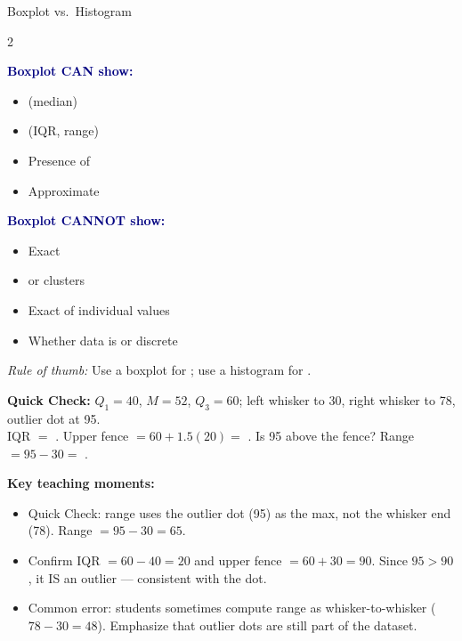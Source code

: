 \documentclass[10pt]{article}
\begin{document}
\vspace{0.08in}

\begin{notesbox}{Boxplot vs.\ Histogram}
\small
\begin{multicols}{2}

\textbf{\textcolor{navy}{Boxplot CAN show:}}
\begin{itemize}[itemsep=3pt]
  \item {} (median)
  \item {} (IQR, range)
  \item Presence of 
  \item Approximate 
\end{itemize}

\columnbreak

\textbf{\textcolor{navy}{Boxplot CANNOT show:}}
\begin{itemize}[itemsep=3pt]
  \item Exact 
  \item {} or clusters
  \item Exact  of individual values
  \item Whether data is  or discrete
\end{itemize}

\end{multicols}

\vspace{4pt}
\textit{Rule of thumb:} Use a boxplot for ;
use a histogram for .
\end{notesbox}

\vspace{0.08in}

\begin{tcolorbox}[colback=goldbg, colframe=goldacc, boxrule=0.8pt, arc=2mm,
    left=4mm, right=4mm, top=2mm, bottom=2mm]
\small\textbf{Quick Check:} $Q_1 = 40$, $M = 52$, $Q_3 = 60$; left whisker to 30,
right whisker to 78, outlier dot at 95.\\[4pt]
IQR $= $ . \quad
Upper fence $= 60 + 1.5(20) = $ . \quad
Is 95 above the fence?  \quad
Range $= 95 - 30 = $ .
\end{tcolorbox}

\begin{teachernote}
\textbf{Key teaching moments:}
\begin{itemize}[itemsep=2pt]
  \item Quick Check: range uses the outlier dot (95) as the max, not the whisker end (78). Range $= 95 - 30 = 65$.
  \item Confirm IQR $= 60 - 40 = 20$ and upper fence $= 60 + 30 = 90$. Since $95 > 90$, it IS an outlier — consistent with the dot.
  \item Common error: students sometimes compute range as whisker-to-whisker ($78 - 30 = 48$). Emphasize that outlier dots are still part of the dataset.
\end{itemize}
\end{teachernote}
\end{document}
